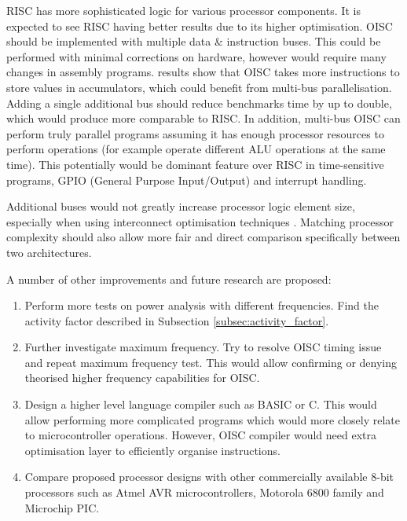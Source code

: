 RISC has more sophisticated logic for various processor components. It is expected to see RISC having better results due to its higher optimisation. OISC should be implemented with multiple data \& instruction buses. This could be performed with minimal corrections on hardware, however would require many changes in assembly programs.  results show that OISC takes more instructions to store values in accumulators, which could benefit from multi-bus parallelisation. Adding a single additional bus should reduce benchmarks time by up to double, which would produce more comparable to RISC. In addition, multi-bus OISC can perform truly parallel programs assuming it has enough processor resources to perform operations (for example operate different ALU operations at the same time). This potentially would be dominant feature over RISC in time-sensitive programs, GPIO (General Purpose Input/Output) and interrupt handling. 

Additional buses would not greatly increase processor logic element size, especially when using interconnect optimisation techniques \autocite{1207041,6972455}. Matching processor complexity should also allow more fair and direct comparison specifically between two architectures. 

A number of other improvements and future research are proposed:
\begin{enumerate}
	\item Perform more tests on power analysis with different frequencies. Find the activity factor described in Subsection \ref{subsec:activity_factor}.
	\item Further investigate maximum frequency. Try to resolve OISC timing issue and repeat maximum frequency test. This would allow confirming or denying theorised higher frequency capabilities for OISC. 
	\item Design a higher level language compiler such as BASIC or C. This would allow performing more complicated programs which would more closely relate to microcontroller operations. However, OISC compiler would need extra optimisation layer to efficiently organise instructions.
	\item Compare proposed processor designs with other commercially available 8-bit processors such as Atmel AVR microcontrollers, Motorola 6800 family and Microchip PIC.
\end{enumerate}

